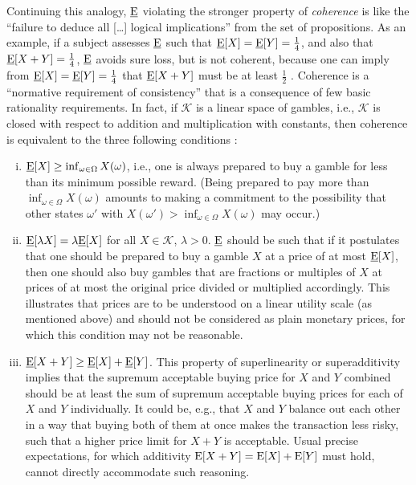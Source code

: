 Continuing this analogy, $\underline{\operatorname{E}}$ violating the stronger property of \emph{coherence}
is like the ``failure to deduce all [\ldots] logical implications''
\parencite[\S 2.4, footnote~1]{1991:walley} from the set of propositions.
As an example, if a subject assesses $\underline{\operatorname{E}}$ such that $\underline{\operatorname{E}}[X] = \underline{\operatorname{E}}[Y] = \frac{1}{4}$,
and also that $\underline{\operatorname{E}}[X+Y] = \frac{1}{4}$, $\underline{\operatorname{E}}$ avoids sure loss, but is not coherent,
because one can imply from $\underline{\operatorname{E}}[X] = \underline{\operatorname{E}}[Y] = \frac{1}{4}$ that
$\underline{\operatorname{E}}[X+Y]$ must be at least $\frac{1}{2}$ \parencite[p.~67]{1991:walley}.
Coherence is a ``normative requirement of consistency'' \parencite[p.~130]{2000:walley::towards}
that is a consequence of few basic rationality requirements.
In fact, if $\mathcal{K}$ is a linear space of gambles,
i.e., $\mathcal{K}$ is closed with respect to addition and multiplication with constants,
then coherence is equivalent to the three following conditions
\parencite[e.g.,][p.~11]{1996:walley::expert}:
\begin{enumerate}[(i)]
\item $\underline{\operatorname{E}}[X] \ge \inf_{\omega \in \Omega} X(\omega)$,
i.e., one is always prepared to buy a gamble for less than its minimum possible reward.
(Being prepared to pay more than $\inf_{\omega \in \Omega} X(\omega)$ amounts to making a commitment to the
possibility that other states $\omega'$ with $X(\omega') > \inf_{\omega \in \Omega} X(\omega)$ may occur.)
\item $\underline{\operatorname{E}}[\lambda X] = \lambda \underline{\operatorname{E}}[X]$ for all $X \in \mathcal{K}$, $\lambda > 0$.
$\underline{\operatorname{E}}$ should be such that if it postulates that one should be prepared to buy a gamble $X$ at a price
of at most $\underline{\operatorname{E}}[X]$, then one should also buy gambles that are fractions or multiples of $X$
at prices of at most the original price divided or multiplied accordingly.
This illustrates that prices are to be understood on a linear utility scale
(as mentioned above) and should not be considered as plain monetary prices,
for which this condition may not be reasonable.
\item $\underline{\operatorname{E}}[X+Y] \ge \underline{\operatorname{E}}[X] + \underline{\operatorname{E}}[Y]$.
This property of superlinearity or superadditivity implies that the supremum acceptable buying price for $X$ and $Y$ combined
should be at least the sum of supremum acceptable buying prices for each of $X$ and $Y$ individually.
It could be, e.g., that $X$ and $Y$ balance out each other in a way that
buying both of them at once makes the transaction less risky,
such that a higher price limit for $X + Y$ is acceptable.
Usual precise expectations, for which additivity $\operatorname{E}[X+Y] = \operatorname{E}[X] + \operatorname{E}[Y]$ must hold,
cannot directly accommodate such reasoning.
\end{enumerate}

